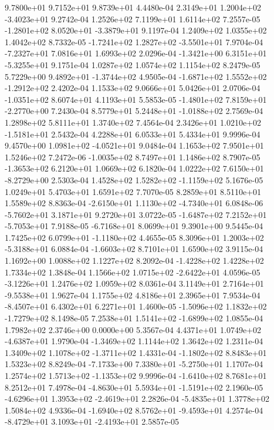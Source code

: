 9.7800e+01 9.7152e+01 9.8739e+01  4.4480e-04
 2.3149e+01  1.2004e+02 -3.4023e+01  9.2742e-04
1.2526e+02 7.1199e+01 1.6114e+02  7.2557e-05
-1.2801e+02  8.0520e+01 -3.3879e+01  9.1197e-04
1.2409e+02 1.0355e+02 1.4042e+02  8.7332e-05
-1.7241e+02  1.2827e+02 -3.5501e+01  7.9704e-04
-7.2327e+01  7.0816e+01  1.6993e+02  2.0296e-04
-1.3421e+00  6.3151e+01 -5.3255e+01  9.1751e-04
1.0287e+02 1.0574e+02 1.1154e+02  8.2479e-05
 5.7229e+00  9.4892e+01 -1.3744e+02  4.9505e-04
-1.6871e+02  1.5552e+02 -1.2912e+02  2.4202e-04
1.1533e+02 9.0666e+01 5.0426e+01  2.0706e-04
-1.0351e+02  8.6074e+01  4.1193e+01  5.5853e-05
-1.4801e+02  7.8159e+01 -2.2770e+00  7.2430e-04
 8.5779e+01  5.2448e+01 -1.0188e+02  2.7569e-04
1.2898e+02 5.8111e+01 1.3740e+02  7.4564e-04
 2.3426e+01  1.0210e+02 -1.5181e+01  2.5432e-04
4.2288e+01 6.0533e+01 5.4334e+01  9.9996e-04
 9.4570e+00  1.0981e+02 -4.0521e+01  9.0484e-04
1.1653e+02 7.9501e+01 1.5246e+02  7.2472e-06
-1.0035e+02  8.7497e+01  1.1486e+02  8.7907e-05
-1.3653e+02  6.2120e+01  1.0669e+02  6.1820e-04
 1.0222e+02  7.6150e+01 -8.2729e+00  2.5303e-04
 1.4528e+02  1.5282e+02 -1.1159e+02  5.1676e-05
1.0249e+01 5.4703e+01 1.6591e+02  7.7070e-05
8.2859e+01 8.5110e+01 1.5589e+02  8.8363e-04
-2.6150e+01  1.1130e+02 -4.7340e+01  6.0848e-06
-5.7602e+01  3.1871e+01  9.2720e+01  3.0722e-05
-1.6487e+02  7.2152e+01 -5.7053e+01  7.9188e-05
-6.7168e+01  8.0699e+01  9.3901e+00  9.5445e-04
 1.7425e+02  6.0799e+01 -1.1180e+02  4.4655e-05
 8.3096e+01  1.2003e+02 -5.3188e+01  6.0884e-04
-1.6603e+02  8.7101e+01  1.6590e+02  3.9115e-04
1.1692e+00 1.0088e+02 1.1227e+02  8.2092e-04
-1.4228e+02  1.4228e+02  1.7334e+02  1.3848e-04
 1.1566e+02  1.0715e+02 -2.6422e+01  4.0596e-05
-3.1226e+01  1.2476e+02  1.0959e+02  8.0361e-04
 3.1149e+01  2.7164e+01 -9.5538e+01  1.9627e-04
1.1755e+02 4.8186e+01 2.3965e+01  7.9534e-04
-8.4507e+01  6.4302e+01  6.2271e+01  1.4600e-05
-1.5096e+02  1.1832e+02 -1.7279e+02  8.1498e-05
 7.2538e+01  1.5141e+02 -1.6899e+02  1.0855e-04
1.7982e+02 2.3746e+00 0.0000e+00  5.3567e-04
 4.4371e+01  1.0749e+02 -4.6387e+01  1.9790e-04
-1.3469e+02  1.1144e+02  1.3642e+02  1.2311e-04
 1.3409e+02  1.1078e+02 -1.3711e+02  1.4331e-04
-1.1802e+02  8.8483e+01  1.5323e+02  8.8249e-04
-7.1733e+00  7.3380e+01 -5.2750e+01  1.1707e-04
 1.2574e+02  1.5713e+02 -1.1353e+02  9.9996e-04
-1.6410e+02  8.7681e+01  8.2512e+01  7.4978e-04
-4.8630e+01  5.5934e+01 -1.5191e+02  2.1960e-05
-4.6296e+01  1.3953e+02 -2.4619e+01  2.2826e-04
-5.4835e+01  1.3778e+02  1.5084e+02  4.9336e-04
-1.6940e+02  8.5762e+01 -9.4593e+01  4.2574e-04
-8.4729e+01  3.1093e+01 -2.4193e+01  2.5857e-05
